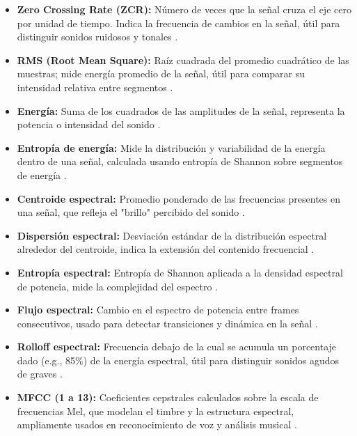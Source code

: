 \begin{itemize}
    \item \textbf{Zero Crossing Rate (ZCR):} Número de veces que la señal cruza el eje cero por unidad de tiempo. Indica la frecuencia de cambios en la señal, útil para distinguir sonidos ruidosos y tonales \cite{muller2015fundamentals}.

    \item \textbf{RMS (Root Mean Square):} Raíz cuadrada del promedio cuadrático de las muestras; mide energía promedio de la señal, útil para comparar su intensidad relativa entre segmentos \cite{sound_quality_heyboer2010}.

    \item \textbf{Energía:} Suma de los cuadrados de las amplitudes de la señal, representa la potencia o intensidad del sonido \cite{rabiner2010fundamentals}.

    \item \textbf{Entropía de energía:} Mide la distribución y variabilidad de la energía dentro de una señal, calculada usando entropía de Shannon sobre segmentos de energía \cite{li2017audio}.

    \item \textbf{Centroide espectral:} Promedio ponderado de las frecuencias presentes en una señal, que refleja el "brillo" percibido del sonido \cite{peeters2004musical}.

    \item \textbf{Dispersión espectral:} Desviación estándar de la distribución espectral alrededor del centroide, indica la extensión del contenido frecuencial \cite{peeters2004musical}.

    \item \textbf{Entropía espectral:} Entropía de Shannon aplicada a la densidad espectral de potencia, mide la complejidad del espectro \cite{jiang2011spectral}.

    \item \textbf{Flujo espectral:} Cambio en el espectro de potencia entre frames consecutivos, usado para detectar transiciones y dinámica en la señal \cite{foote1999automatic}.

    \item \textbf{Rolloff espectral:} Frecuencia debajo de la cual se acumula un porcentaje dado (e.g., 85\%) de la energía espectral, útil para distinguir sonidos agudos de graves \cite{tzanetakis2002musical}.

    \item \textbf{MFCC (1 a 13):} Coeficientes cepstrales calculados sobre la escala de frecuencias Mel, que modelan el timbre y la estructura espectral, ampliamente usados en reconocimiento de voz y análisis musical \cite{davis1980comparison}.
\end{itemize}


